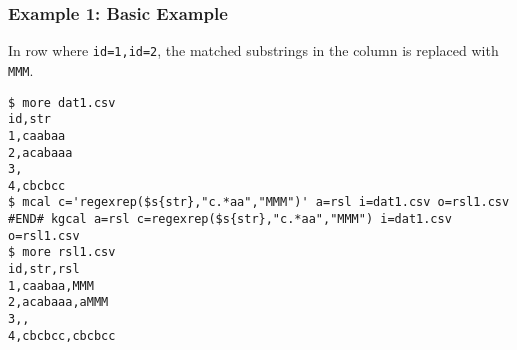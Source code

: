 \subsubsection*{Example 1: Basic Example}

In row where \verb|id=1,id=2|, the matched substrings in the column is replaced with \verb|MMM|.


\begin{Verbatim}[baselinestretch=0.7,frame=single]
$ more dat1.csv
id,str
1,caabaa
2,acabaaa
3,
4,cbcbcc
$ mcal c='regexrep($s{str},"c.*aa","MMM")' a=rsl i=dat1.csv o=rsl1.csv
#END# kgcal a=rsl c=regexrep($s{str},"c.*aa","MMM") i=dat1.csv o=rsl1.csv
$ more rsl1.csv
id,str,rsl
1,caabaa,MMM
2,acabaaa,aMMM
3,,
4,cbcbcc,cbcbcc
\end{Verbatim}
